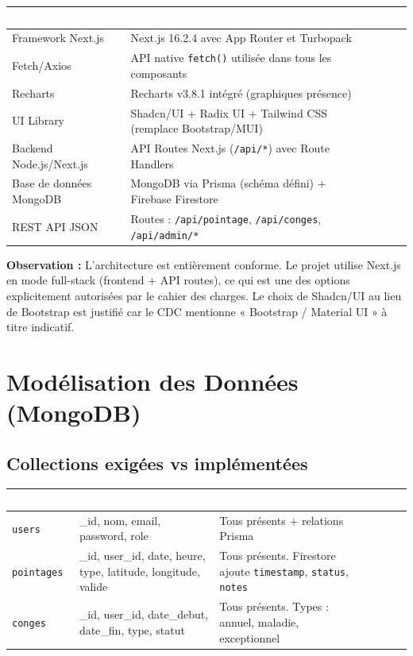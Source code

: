 \documentclass[12pt,a4paper]{article}
\newcommand{\cmark}{\textcolor{vert}{\ding{51}}}
\begin{document}
\begin{longtable}{p{5.5cm} p{6cm} c}
\toprule
\rowcolor{headerblue}
\textcolor{white}{\textbf{Exigence}} & \textcolor{white}{\textbf{Implémentation}} & \textcolor{white}{\textbf{Statut}} \\
\midrule
\endhead
Framework Next.js & Next.js 16.2.4 avec App Router et Turbopack & \cmark \\
\midrule
Fetch/Axios & API native \texttt{fetch()} utilisée dans tous les composants & \cmark \\
\midrule
Recharts & Recharts v3.8.1 intégré (graphiques présence) & \cmark \\
\midrule
UI Library & Shadcn/UI + Radix UI + Tailwind CSS (remplace Bootstrap/MUI) & \cmark \\
\midrule
Backend Node.js/Next.js & API Routes Next.js (\texttt{/api/*}) avec Route Handlers & \cmark \\
\midrule
Base de données MongoDB & MongoDB via Prisma (schéma défini) + Firebase Firestore & \cmark \\
\midrule
REST API JSON & Routes : \texttt{/api/pointage}, \texttt{/api/conges}, \texttt{/api/admin/*} & \cmark \\
\bottomrule
\end{longtable}

\textbf{Observation :} L'architecture est entièrement conforme. Le projet utilise Next.js en mode full-stack (frontend + API routes), ce qui est une des options explicitement autorisées par le cahier des charges. Le choix de Shadcn/UI au lieu de Bootstrap est justifié car le CDC mentionne « Bootstrap / Material UI » à titre indicatif.

\section{Modélisation des Données (MongoDB)}

\subsection{Collections exigées vs implémentées}

\begin{longtable}{p{2.5cm} p{5cm} p{5cm} c}
\toprule
\rowcolor{headerblue}
\textcolor{white}{\textbf{Collection}} & \textcolor{white}{\textbf{Champs requis (CDC)}} & \textcolor{white}{\textbf{Champs implémentés}} & \textcolor{white}{\textbf{Statut}} \\
\midrule
\endhead
\texttt{users} & \_id, nom, email, password, role & Tous présents + relations Prisma & \cmark \\
\midrule
\texttt{pointages} & \_id, user\_id, date, heure, type, latitude, longitude, valide & Tous présents. Firestore ajoute \texttt{timestamp}, \texttt{status}, \texttt{notes} & \cmark \\
\midrule
\texttt{conges} & \_id, user\_id, date\_debut, date\_fin, type, statut & Tous présents. Types : annuel, maladie, exceptionnel & \cmark \\
\bottomrule
\end{longtable}
\end{document}
